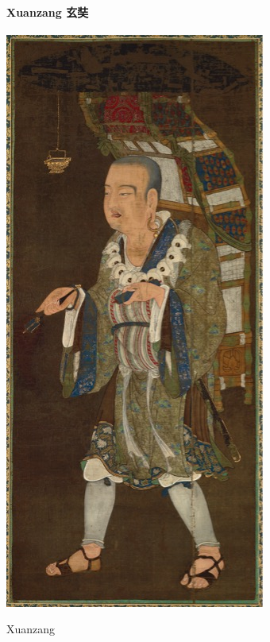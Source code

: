 \paragraph{Xuanzang 玄奘 }
\begin{marginfigure}
    \centering
    \includegraphics[width=\textwidth]{ConfucianismeTaoismeBouddhismeChinois/Xuanzang.jpg}
    \caption{Xuanzang}
    \label{fig:enter-label}
\end{marginfigure}

